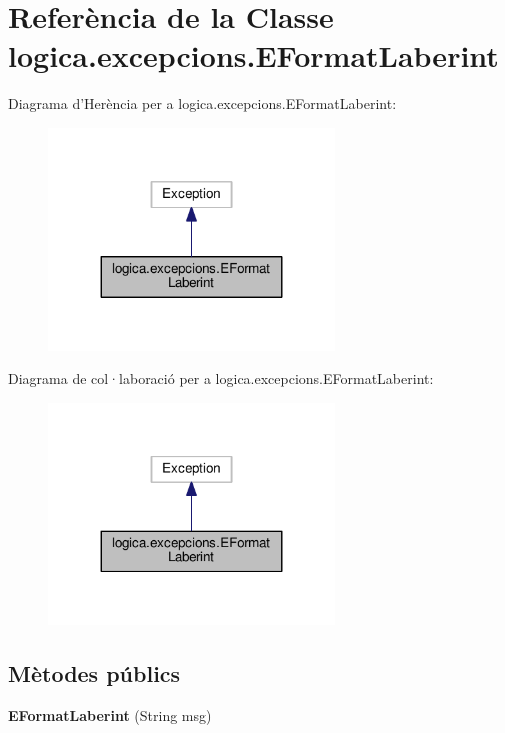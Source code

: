 \hypertarget{classlogica_1_1excepcions_1_1_e_format_laberint}{\section{Referència de la Classe logica.\+excepcions.\+E\+Format\+Laberint}
\label{classlogica_1_1excepcions_1_1_e_format_laberint}
}


Diagrama d'Herència per a logica.\+excepcions.\+E\+Format\+Laberint\+:\nopagebreak
\begin{figure}[H]
\begin{center}
\leavevmode
\includegraphics[width=215pt]{classlogica_1_1excepcions_1_1_e_format_laberint__inherit__graph}
\end{center}
\end{figure}


Diagrama de col·laboració per a logica.\+excepcions.\+E\+Format\+Laberint\+:\nopagebreak
\begin{figure}[H]
\begin{center}
\leavevmode
\includegraphics[width=215pt]{classlogica_1_1excepcions_1_1_e_format_laberint__coll__graph}
\end{center}
\end{figure}
\subsection*{Mètodes públics}
\begin{DoxyCompactItemize}
\item 
\hypertarget{classlogica_1_1excepcions_1_1_e_format_laberint_a3351507df19d79e2eb3728c804687990}{{\bfseries E\+Format\+Laberint} (String msg)}\label{classlogica_1_1excepcions_1_1_e_format_laberint_a3351507df19d79e2eb3728c804687990}

\end{DoxyCompactItemize}


